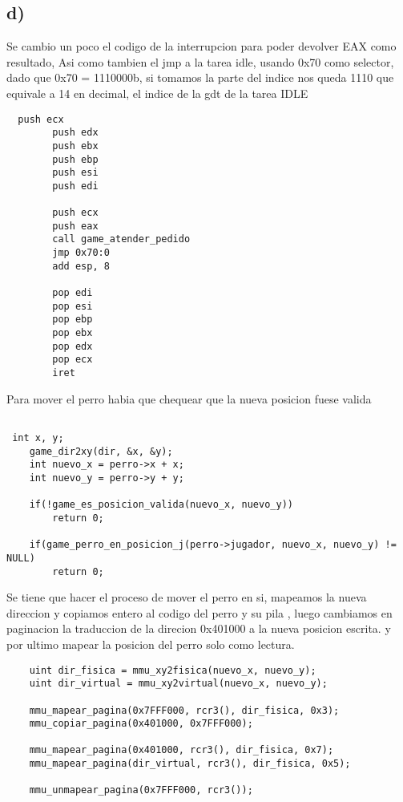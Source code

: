 \subsection{d)}
Se cambio un poco el codigo de la interrupcion para poder devolver EAX como resultado,
Asi como tambien el jmp a la tarea idle, usando 0x70 como selector, dado que 0x70 = 1110000b, si tomamos la parte del indice nos queda 1110 que equivale a 14 en decimal, el indice de la gdt de la tarea IDLE
  \begin{codesnippet}
\begin{verbatim}
  push ecx
        push edx
        push ebx
        push ebp
        push esi
        push edi

        push ecx
        push eax
        call game_atender_pedido
        jmp 0x70:0
        add esp, 8

        pop edi
        pop esi
        pop ebp
        pop ebx
        pop edx
        pop ecx
        iret    
   \end{verbatim}
\end{codesnippet}

Para mover el perro  habia que chequear que la nueva posicion fuese valida
  \begin{codesnippet}
\begin{verbatim}

 int x, y;
    game_dir2xy(dir, &x, &y);
    int nuevo_x = perro->x + x;
    int nuevo_y = perro->y + y;

    if(!game_es_posicion_valida(nuevo_x, nuevo_y))
        return 0;

    if(game_perro_en_posicion_j(perro->jugador, nuevo_x, nuevo_y) != NULL)
        return 0;
   \end{verbatim}
\end{codesnippet}
 
Se tiene que hacer el proceso de mover el perro en si, mapeamos la nueva direccion y copiamos entero al codigo del perro y su pila
, luego cambiamos en paginacion la traduccion de la direcion 0x401000 a la nueva posicion escrita. y por ultimo mapear la posicion del perro solo como lectura.
  \begin{codesnippet}
\begin{verbatim}
    uint dir_fisica = mmu_xy2fisica(nuevo_x, nuevo_y);
    uint dir_virtual = mmu_xy2virtual(nuevo_x, nuevo_y);

    mmu_mapear_pagina(0x7FFF000, rcr3(), dir_fisica, 0x3);
    mmu_copiar_pagina(0x401000, 0x7FFF000);

    mmu_mapear_pagina(0x401000, rcr3(), dir_fisica, 0x7);
    mmu_mapear_pagina(dir_virtual, rcr3(), dir_fisica, 0x5);

    mmu_unmapear_pagina(0x7FFF000, rcr3());
   \end{verbatim}
\end{codesnippet}
 
